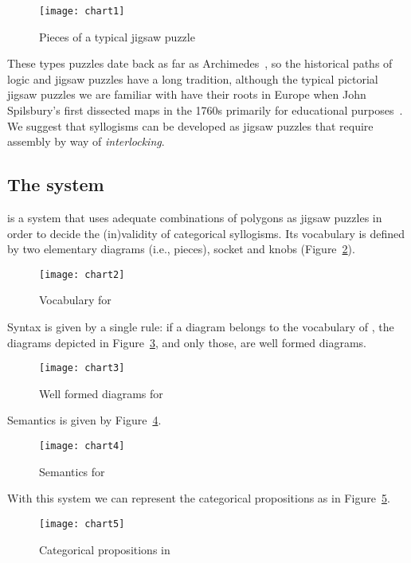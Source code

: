 \documentclass[a4paper,UKenglish]{lipics}
\begin{document}
\begin{figure}[h]
  \texttt{[image: chart1]}
  \caption{Pieces of a typical jigsaw puzzle}
  \label{fig:0}
\end{figure}

These types puzzles date back as far as Archimedes~\cite{SLOCUM}, so the historical paths of logic and jigsaw puzzles have a long tradition, although the typical pictorial jigsaw puzzles we are familiar with have their roots in Europe when John Spilsbury's first dissected maps in the 1760s primarily for educational purposes~\cite{WILLIAMS}. We suggest that syllogisms can be developed as jigsaw puzzles that require assembly by way of \textit{interlocking}.

\pagebreak

\subsection{The system }
 is a system that uses adequate combinations of polygons as jigsaw puzzles in order to decide the (in)validity of categorical syllogisms. Its vocabulary is defined by two elementary diagrams (i.e., pieces), socket and knobs (Figure~\ref{fig:1}). 
 
\begin{figure}[h]
  \texttt{[image: chart2]}
  \caption{Vocabulary for }
  \label{fig:1}
\end{figure}

Syntax is given by a single rule: if a diagram belongs to the vocabulary of , the diagrams depicted in Figure~\ref{fig:2}, and only those, are well formed diagrams. 

\begin{figure}[h]
  \texttt{[image: chart3]}
  \caption{Well formed diagrams for }
  \label{fig:2}
\end{figure}

Semantics is given by Figure~\ref{fig:3}. 

\begin{figure}[h]
  \texttt{[image: chart4]}
  \caption{Semantics for }
  \label{fig:3}
\end{figure}

\pagebreak

With this system we can represent the categorical propositions as in Figure~\ref{fig:4}. 

\begin{figure}[h]
  \texttt{[image: chart5]}
  \caption{Categorical propositions in }
  \label{fig:4}
\end{figure}
\end{document}

